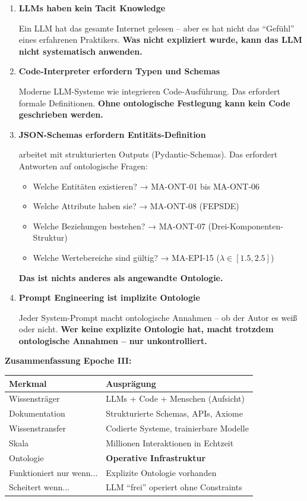\begin{enumerate}
    \item \textbf{LLMs haben kein Tacit Knowledge}

    Ein LLM hat das gesamte Internet gelesen -- aber es hat nicht das ``Gefühl'' eines erfahrenen Praktikers. \textbf{Was nicht expliziert wurde, kann das LLM nicht systematisch anwenden.}

    \item \textbf{Code-Interpreter erfordern Typen und Schemas}

    Moderne LLM-Systeme wie \BEATRIX{} integrieren Code-Ausführung. Das erfordert formale Definitionen. \textbf{Ohne ontologische Festlegung kann kein Code geschrieben werden.}

    \item \textbf{JSON-Schemas erfordern Entitäts-Definition}

    \BEATRIX{} arbeitet mit strukturierten Outputs (Pydantic-Schemas). Das erfordert Antworten auf ontologische Fragen:
    \begin{itemize}
        \item Welche Entitäten existieren? → MA-ONT-01 bis MA-ONT-06
        \item Welche Attribute haben sie? → MA-ONT-08 (FEPSDE)
        \item Welche Beziehungen bestehen? → MA-ONT-07 (Drei-Komponenten-Struktur)
        \item Welche Wertebereiche sind gültig? → MA-EPI-15 ($\lambda \in [1.5, 2.5]$)
    \end{itemize}

    \textbf{Das ist nichts anderes als angewandte Ontologie.}

    \item \textbf{Prompt Engineering ist implizite Ontologie}

    Jeder System-Prompt macht ontologische Annahmen -- ob der Autor es weiß oder nicht. \textbf{Wer keine explizite Ontologie hat, macht trotzdem ontologische Annahmen -- nur unkontrolliert.}
\end{enumerate}

\textbf{Zusammenfassung Epoche III:}
\begin{table}[h]
\centering
\begin{tabular}{@{}ll@{}}
\toprule
\textbf{Merkmal} & \textbf{Ausprägung} \\
\midrule
Wissensträger & LLMs + Code + Menschen (Aufsicht) \\
Dokumentation & Strukturierte Schemas, APIs, Axiome \\
Wissenstransfer & Codierte Systeme, trainierbare Modelle \\
Skala & Millionen Interaktionen in Echtzeit \\
Ontologie & \textbf{Operative Infrastruktur} \\
Funktioniert nur wenn... & Explizite Ontologie vorhanden \\
Scheitert wenn... & LLM ``frei'' operiert ohne Constraints \\
\bottomrule
\end{tabular}
\end{table}

